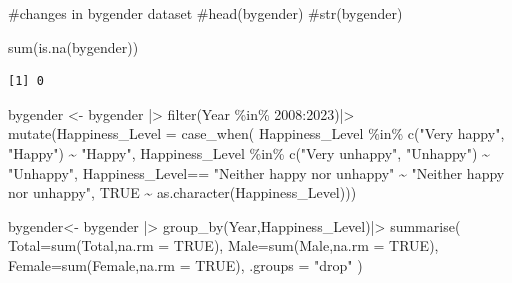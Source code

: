 \documentclass[
  11pt,
  a4paper,
  DIV=11,
  numbers=noendperiod]{scrartcl}
\newenvironment{Shaded}{\begin{snugshade}}{\end{snugshade}}
\newcommand{\AttributeTok}[1]{\textcolor[rgb]{0.40,0.45,0.13}{#1}}
\newcommand{\CommentTok}[1]{\textcolor[rgb]{0.37,0.37,0.37}{#1}}
\newcommand{\ConstantTok}[1]{\textcolor[rgb]{0.56,0.35,0.01}{#1}}
\newcommand{\DecValTok}[1]{\textcolor[rgb]{0.68,0.00,0.00}{#1}}
\newcommand{\FunctionTok}[1]{\textcolor[rgb]{0.28,0.35,0.67}{#1}}
\newcommand{\NormalTok}[1]{\textcolor[rgb]{0.00,0.23,0.31}{#1}}
\newcommand{\OtherTok}[1]{\textcolor[rgb]{0.00,0.23,0.31}{#1}}
\newcommand{\SpecialCharTok}[1]{\textcolor[rgb]{0.37,0.37,0.37}{#1}}
\newcommand{\StringTok}[1]{\textcolor[rgb]{0.13,0.47,0.30}{#1}}
\begin{document}
\begin{Shaded}
\begin{Highlighting}[]
\CommentTok{\#changes in bygender dataset}
\CommentTok{\#head(bygender)}
\CommentTok{\#str(bygender)}

\FunctionTok{sum}\NormalTok{(}\FunctionTok{is.na}\NormalTok{(bygender))}
\end{Highlighting}
\end{Shaded}

\begin{verbatim}
[1] 0
\end{verbatim}

\begin{Shaded}
\begin{Highlighting}[]
\NormalTok{bygender }\OtherTok{\textless{}{-}}\NormalTok{ bygender }\SpecialCharTok{|\textgreater{}} \FunctionTok{filter}\NormalTok{(Year }\SpecialCharTok{\%in\%} \DecValTok{2008}\SpecialCharTok{:}\DecValTok{2023}\NormalTok{)}\SpecialCharTok{|\textgreater{}}
  \FunctionTok{mutate}\NormalTok{(}\AttributeTok{Happiness\_Level =} \FunctionTok{case\_when}\NormalTok{(}
\NormalTok{    Happiness\_Level }\SpecialCharTok{\%in\%} \FunctionTok{c}\NormalTok{(}\StringTok{"Very happy"}\NormalTok{, }\StringTok{"Happy"}\NormalTok{) }\SpecialCharTok{\textasciitilde{}} \StringTok{"Happy"}\NormalTok{,}
\NormalTok{    Happiness\_Level }\SpecialCharTok{\%in\%} \FunctionTok{c}\NormalTok{(}\StringTok{"Very unhappy"}\NormalTok{, }\StringTok{"Unhappy"}\NormalTok{) }\SpecialCharTok{\textasciitilde{}} \StringTok{"Unhappy"}\NormalTok{,}
\NormalTok{    Happiness\_Level}\SpecialCharTok{==} \StringTok{"Neither happy nor unhappy"} \SpecialCharTok{\textasciitilde{}} \StringTok{"Neither happy nor unhappy"}\NormalTok{,}
    \ConstantTok{TRUE} \SpecialCharTok{\textasciitilde{}} \FunctionTok{as.character}\NormalTok{(Happiness\_Level))) }
  
\NormalTok{  bygender}\OtherTok{\textless{}{-}}\NormalTok{ bygender }\SpecialCharTok{|\textgreater{}} \FunctionTok{group\_by}\NormalTok{(Year,Happiness\_Level)}\SpecialCharTok{|\textgreater{}} 
  \FunctionTok{summarise}\NormalTok{(}
    \AttributeTok{Total=}\FunctionTok{sum}\NormalTok{(Total,}\AttributeTok{na.rm =} \ConstantTok{TRUE}\NormalTok{),}
    \AttributeTok{Male=}\FunctionTok{sum}\NormalTok{(Male,}\AttributeTok{na.rm =} \ConstantTok{TRUE}\NormalTok{),}
    \AttributeTok{Female=}\FunctionTok{sum}\NormalTok{(Female,}\AttributeTok{na.rm =} \ConstantTok{TRUE}\NormalTok{),}
    \AttributeTok{.groups =} \StringTok{"drop"}
\NormalTok{  )}


\end{Highlighting}
\end{Shaded}
\end{document}
